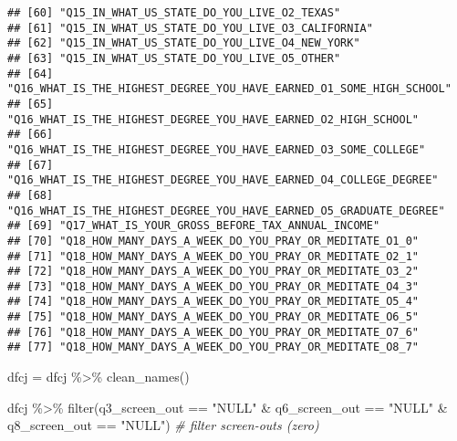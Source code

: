 \documentclass[
]{article}
\newenvironment{Shaded}{\begin{snugshade}}{\end{snugshade}}
\newcommand{\CommentTok}[1]{\textcolor[rgb]{0.56,0.35,0.01}{\textit{#1}}}
\newcommand{\FunctionTok}[1]{\textcolor[rgb]{0.00,0.00,0.00}{#1}}
\newcommand{\NormalTok}[1]{#1}
\newcommand{\OtherTok}[1]{\textcolor[rgb]{0.56,0.35,0.01}{#1}}
\newcommand{\SpecialCharTok}[1]{\textcolor[rgb]{0.00,0.00,0.00}{#1}}
\newcommand{\StringTok}[1]{\textcolor[rgb]{0.31,0.60,0.02}{#1}}
\begin{document}
\begin{verbatim}
## [60] "Q15_IN_WHAT_US_STATE_DO_YOU_LIVE_O2_TEXAS"                                                                                   
## [61] "Q15_IN_WHAT_US_STATE_DO_YOU_LIVE_O3_CALIFORNIA"                                                                              
## [62] "Q15_IN_WHAT_US_STATE_DO_YOU_LIVE_O4_NEW_YORK"                                                                                
## [63] "Q15_IN_WHAT_US_STATE_DO_YOU_LIVE_O5_OTHER"                                                                                   
## [64] "Q16_WHAT_IS_THE_HIGHEST_DEGREE_YOU_HAVE_EARNED_O1_SOME_HIGH_SCHOOL"                                                          
## [65] "Q16_WHAT_IS_THE_HIGHEST_DEGREE_YOU_HAVE_EARNED_O2_HIGH_SCHOOL"                                                               
## [66] "Q16_WHAT_IS_THE_HIGHEST_DEGREE_YOU_HAVE_EARNED_O3_SOME_COLLEGE"                                                              
## [67] "Q16_WHAT_IS_THE_HIGHEST_DEGREE_YOU_HAVE_EARNED_O4_COLLEGE_DEGREE"                                                            
## [68] "Q16_WHAT_IS_THE_HIGHEST_DEGREE_YOU_HAVE_EARNED_O5_GRADUATE_DEGREE"                                                           
## [69] "Q17_WHAT_IS_YOUR_GROSS_BEFORE_TAX_ANNUAL_INCOME"                                                                             
## [70] "Q18_HOW_MANY_DAYS_A_WEEK_DO_YOU_PRAY_OR_MEDITATE_O1_0"                                                                       
## [71] "Q18_HOW_MANY_DAYS_A_WEEK_DO_YOU_PRAY_OR_MEDITATE_O2_1"                                                                       
## [72] "Q18_HOW_MANY_DAYS_A_WEEK_DO_YOU_PRAY_OR_MEDITATE_O3_2"                                                                       
## [73] "Q18_HOW_MANY_DAYS_A_WEEK_DO_YOU_PRAY_OR_MEDITATE_O4_3"                                                                       
## [74] "Q18_HOW_MANY_DAYS_A_WEEK_DO_YOU_PRAY_OR_MEDITATE_O5_4"                                                                       
## [75] "Q18_HOW_MANY_DAYS_A_WEEK_DO_YOU_PRAY_OR_MEDITATE_O6_5"                                                                       
## [76] "Q18_HOW_MANY_DAYS_A_WEEK_DO_YOU_PRAY_OR_MEDITATE_O7_6"                                                                       
## [77] "Q18_HOW_MANY_DAYS_A_WEEK_DO_YOU_PRAY_OR_MEDITATE_O8_7"
\end{verbatim}

\begin{Shaded}
\begin{Highlighting}[]
\NormalTok{dfcj }\OtherTok{=}\NormalTok{ dfcj }\SpecialCharTok{\%\textgreater{}\%} 
  \FunctionTok{clean\_names}\NormalTok{() }

\NormalTok{dfcj }\SpecialCharTok{\%\textgreater{}\%} 
  \FunctionTok{filter}\NormalTok{(q3\_screen\_out }\SpecialCharTok{==} \StringTok{"NULL"} \SpecialCharTok{\&}\NormalTok{ q6\_screen\_out }\SpecialCharTok{==} \StringTok{"NULL"} \SpecialCharTok{\&}\NormalTok{ q8\_screen\_out }\SpecialCharTok{==} \StringTok{"NULL"}\NormalTok{) }\CommentTok{\# filter screen{-}outs (zero)}
\end{Highlighting}
\end{Shaded}
\end{document}
